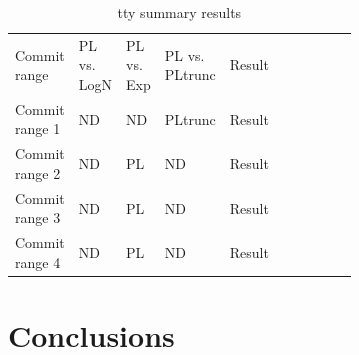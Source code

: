 \documentclass[conference]{IEEEtran}
\begin{document}
\begin{table}[h!tbp]
	\caption{tty summary results}
	\begin{center}
		\begin{tabular}{| p{0.12\linewidth} | p{0.08\linewidth} | p{0.08\linewidth} | p{0.08\linewidth} | p{0.1\linewidth} |p{0.13\linewidth} | p{0.09\linewidth} |}
			\hline
                  Commit range & PL vs. LogN & PL vs. Exp & PL vs. PLtrunc & Result \\
                  Commit range 1 & ND & ND  & PLtrunc & Result \\
                  Commit range 2& ND & PL  & ND & Result \\
                  Commit range 3& ND  &  PL & ND & Result \\
                  Commit range 4& ND & PL  & ND & Result \\
			\hline

			\hline
		\end{tabular}
	\end{center}
\label{tab:2019teststty}
\end{table}




\section{Conclusions}\label{conc}


 
\end{document}
